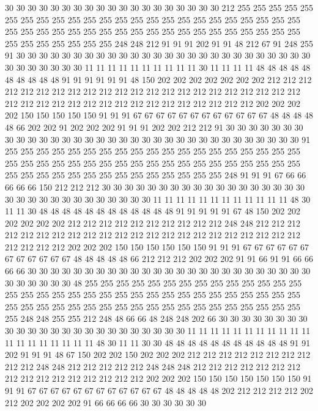 30 30 30 30 30 30 30 30 30 30 30 30 30 30 30 30 30 30 30 212
255 255 255 255 255 255 255 255 255 255 255 255 255 255 255 255 255 255 255 255
255 255 255 255 255 255 255 255 255 255 255 255 255 255 255 255 255 255 255 255
255 255 255 255 255 255 255 255 255 255 248 248 212 91 91 91 202 91 91 48
212 67 91 248 255 91 30 30 30 30 30 30 30 30 30 30 30 30 30 30
30 30 30 30 30 30 30 30 30 30 30 30 30 30 30 30 30 30 30 11
11 11 11 11 11 11 11 11 11 30 11 11 11 11 48 48 48 48 48 48
48 48 48 48 91 91 91 91 91 91 48 150 202 202 202 202 202 202 202 212
212 212 212 212 212 212 212 212 212 212 212 212 212 212 212 212 212 212 212 212
212 212 212 212 212 212 212 212 212 212 212 212 212 212 212 212 212 202 202 202
202 150 150 150 150 150 91 91 91 67 67 67 67 67 67 67 67 67 67 67
67 48 48 48 48 48 66 202 202 91 202 202 202 91 91 91 202 202 212 212
91 30 30 30 30 30 30 30 30 30 30 30 30 30 30 30 30 30 30 30
30 30 30 30 30 30 30 30 30 30 30 30 30 30 91 255 255 255 255 255
255 255 255 255 255 255 255 255 255 255 255 255 255 255 255 255 255 255 255 255
255 255 255 255 255 255 255 255 255 255 255 255 255 255 255 255 255 255 255 255
255 255 255 255 255 255 255 248 91 91 91 67 66 66 66 66 66 150 212 212
212 30 30 30 30 30 30 30 30 30 30 30 30 30 30 30 30 30 30 30
30 30 30 30 30 30 30 30 30 30 30 30 11 11 11 11 11 11 11 11
11 11 11 11 48 30 11 11 30 48 48 48 48 48 48 48 48 48 48 48
48 91 91 91 91 91 67 48 150 202 202 202 202 202 202 212 212 212 212 212
212 212 212 212 212 248 248 212 212 212 212 212 212 212 212 212 212 212 212 212
212 212 212 212 212 212 212 212 212 212 212 212 212 202 202 202 150 150 150 150
150 150 91 91 91 67 67 67 67 67 67 67 67 67 67 67 67 48 48 48
48 48 66 212 212 212 202 202 202 91 91 66 91 91 66 66 66 66 30 30
30 30 30 30 30 30 30 30 30 30 30 30 30 30 30 30 30 30 30 30
30 30 30 30 30 30 30 30 30 48 255 255 255 255 255 255 255 255 255 255
255 255 255 255 255 255 255 255 255 255 255 255 255 255 255 255 255 255 255 255
255 255 255 255 255 255 255 255 255 255 255 255 255 255 255 255 255 255 255 255
255 255 255 248 248 255 255 212 248 48 66 66 48 248 248 202 66 30 30 30
30 30 30 30 30 30 30 30 30 30 30 30 30 30 30 30 30 30 30 30
30 11 11 11 11 11 11 11 11 11 11 11 11 11 11 11 11 11 11 11
48 30 11 11 30 30 48 48 48 48 48 48 48 48 48 48 48 91 91 202
91 91 91 48 67 150 202 202 150 202 202 202 212 212 212 212 212 212 212 212
212 212 248 248 212 212 212 212 212 248 248 248 212 212 212 212 212 212 212 212
212 212 212 212 212 212 212 212 202 202 202 150 150 150 150 150 150 150 91 91
91 67 67 67 67 67 67 67 67 67 67 67 67 48 48 48 48 48 202 212
212 212 212 202 212 202 202 202 202 91 66 66 66 66 30 30 30 30 30 30
